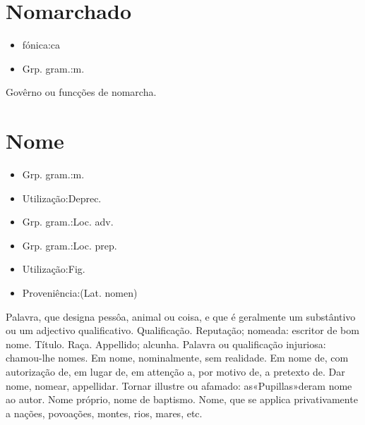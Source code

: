 \section{Nomarchado}
\begin{itemize}
\item {fónica:ca}
\end{itemize}
\begin{itemize}
\item {Grp. gram.:m.}
\end{itemize}
Govêrno ou funcções de nomarcha.
\section{Nome}
\begin{itemize}
\item {Grp. gram.:m.}
\end{itemize}
\begin{itemize}
\item {Utilização:Deprec.}
\end{itemize}
\begin{itemize}
\item {Grp. gram.:Loc. adv.}
\end{itemize}
\begin{itemize}
\item {Grp. gram.:Loc. prep.}
\end{itemize}
\begin{itemize}
\item {Utilização:Fig.}
\end{itemize}
\begin{itemize}
\item {Proveniência:(Lat. \textunderscore nomen\textunderscore )}
\end{itemize}
Palavra, que designa pessôa, animal ou coisa, e que é geralmente um substântivo ou um adjectivo qualificativo.
Qualificação.
Reputação; nomeada: \textunderscore escritor de bom nome\textunderscore .
Título.
Raça.
Appellido; alcunha.
Palavra ou qualificação injuriosa: \textunderscore chamou-lhe nomes\textunderscore .
\textunderscore Em nome\textunderscore , nominalmente, sem realidade.
\textunderscore Em nome de\textunderscore , com autorização de, em lugar de, em attenção a, por motivo de, a pretexto de.
\textunderscore Dar nome\textunderscore , nomear, appellidar.
Tornar illustre ou afamado: \textunderscore as«Pupillas»deram nome ao autor\textunderscore .
\textunderscore Nome próprio\textunderscore , nome de baptismo.
Nome, que se applica privativamente a nações, povoações, montes, rios, mares, etc.
